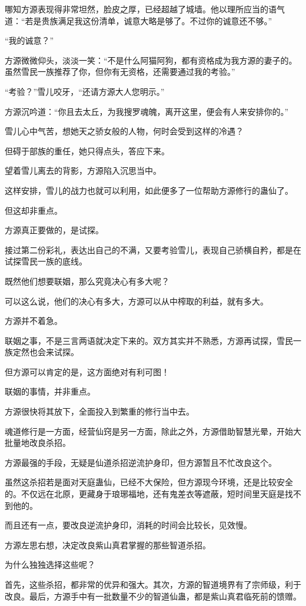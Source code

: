 \begin{this_body}
哪知方源表现得非常坦然，脸皮之厚，已经超越了城墙。他以理所应当的语气道：“若是贵族满足我这份清单，诚意大略是够了。不过你的诚意还不够。”

“我的诚意？”

方源微微仰头，淡淡一笑：“不是什么阿猫阿狗，都有资格成为我方源的妻子的。虽然雪民一族推荐了你，但你有无资格，还需要通过我的考验。”

“考验？”雪儿咬牙，“还请方源大人您明示。”

方源沉吟道：“你且去太丘，为我搜罗魂魄，离开这里，便会有人来安排你的。”

雪儿心中气苦，想她天之骄女般的人物，何时会受到这样的冷遇？

但碍于部族的重任，她只得点头，答应下来。

望着雪儿离去的背影，方源陷入沉思当中。

这样安排，雪儿的战力也就可以利用，如此便多了一位帮助方源修行的蛊仙了。

但这却非重点。

方源真正要做的，是试探。

接过第二份彩礼，表达出自己的不满，又要考验雪儿，表现自己骄横自矜，都是在试探雪民一族的底线。

既然他们想要联姻，那么究竟决心有多大呢？

可以这么说，他们的决心有多大，方源可以从中榨取的利益，就有多大。

方源并不着急。

联姻之事，不是三言两语就决定下来的。双方其实并不熟悉，方源再试探，雪民一族定然也会来试探。

但方源可以肯定的是，这方面绝对有利可图！

联姻的事情，并非重点。

方源很快将其放下，全面投入到繁重的修行当中去。

魂道修行是一方面，经营仙窍是另一方面，除此之外，方源借助智慧光晕，开始大批量地改良杀招。

方源最强的手段，无疑是仙道杀招逆流护身印，但方源暂且不忙改良这个。

虽然这杀招若是面对天庭蛊仙，已经不大保险，但方源现今环境，还是比较安全的。不仅远在北原，更藏身于琅琊福地，还有鬼差衣等遮蔽，短时间里天庭是找不到他的。

而且还有一点，要改良逆流护身印，消耗的时间会比较长，见效慢。

方源左思右想，决定改良紫山真君掌握的那些智道杀招。

为什么独独选择这些呢？

首先，这些杀招，都非常的优异和强大。其次，方源的智道境界有了宗师级，利于改良。最后，方源手中有一批数量不少的智道仙蛊，都是紫山真君临死前的馈赠。


\end{this_body}
